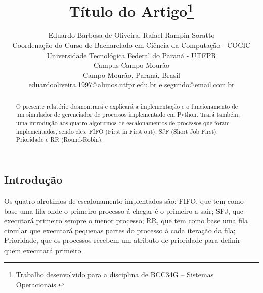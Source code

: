 \documentclass[times, 10pt,twocolumn]{article}
\begin{document}
\begin{savenotes}
\title{Título do Artigo\footnote{Trabalho desenvolvido para a disciplina de BCC34G – Sistemas Operacionais.}}


\author{Eduardo Barbosa de Oliveira, Rafael Rampin Soratto\\
Coordenação do Curso de Bacharelado em Ciência da Computação - COCIC\\
Universidade Tecnológica Federal do Paraná - UTFPR\\ 
Campus Campo Mourão\\
Campo Mourão, Paraná, Brasil\\
eduardooliveira.1997@alunos.utfpr.edu.br e segundo@email.com.br\\
}

\maketitle
\thispagestyle{empty}

\begin{abstract}
    O presente relatório desmontrará e explicará a implementação e o funcionamento de um simulador de gerenciador de processos implementado em Python. Trará também, uma introdução aos quatro algoritmos de escalonamentos de processos que foram implementados, sendo eles: FIFO (First in First out), SJF (Short Job First), Prioridade e RR (Round-Robin).
\end{abstract}
\section{Introdução} \label{sec_introducao}
    Os quatro alrotimos de escalonamento implentados são: FIFO, que tem como base uma fila onde o primeiro processo á chegar é o primeiro a sair; SFJ, que executará primeiro sempre o menor processo; RR, que tem como base uma fila circular que executará pequenas partes do processo à cada iteração da fila; Prioridade, que os processos recebem um atributo de prioridade para definir quem executará primeiro.
\end{savenotes}
\end{document}
